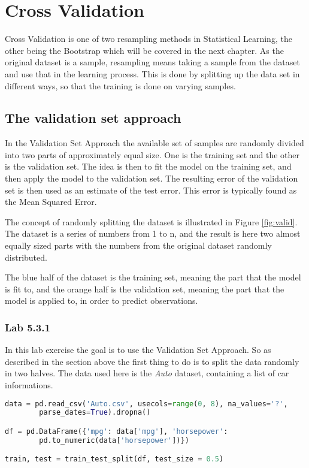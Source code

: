 \chapter{Cross Validation}
\label{chp:crossval}
Cross Validation is one of two resampling methods in Statistical Learning, the other being the Bootstrap which will be covered in the next chapter. As the original dataset is a sample, resampling means taking a sample from the dataset and use that in the learning process. This is done by splitting up the data set in different ways, so that the training is done on varying samples. 

\section{The validation set approach}
\label{sec:VSA}
In the Validation Set Approach the available set of samples are randomly divided into two parts of approximately equal size. One is the training set and the other is the validation set. The idea is then to fit the model on the training set, and then apply the model to the validation set. The resulting error of the validation set is then used as an estimate of the test error. This error is typically found as the Mean Squared Error. 


The concept of randomly splitting the dataset is illustrated in Figure \ref{fig:valid}. The dataset is a series of numbers from 1 to n, and the result is here two almost equally sized parts with the numbers from the original dataset randomly distributed. 

The blue half of the dataset is the training set, meaning the part that the model is fit to, and the orange half is the validation set, meaning the part that the model is applied to, in order to predict observations. 

\subsection{Lab 5.3.1}
In this lab exercise the goal is to use the Validation Set Approach. So as described in the section above the first thing to do is to split the data randomly in two halves. The data used here is the \emph{Auto} dataset, containing a list of car informations. 

\begin{lstlisting}[language=Python, label=lst:lst_valid, caption=Auto dataset randomly split]
data = pd.read_csv('Auto.csv', usecols=range(0, 8), na_values='?',
		parse_dates=True).dropna()

df = pd.DataFrame({'mpg': data['mpg'], 'horsepower':  
		pd.to_numeric(data['horsepower'])})

train, test = train_test_split(df, test_size = 0.5)
\end{lstlisting}

